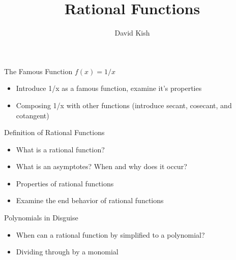 \documentclass{ximera}
\author{David Kish}
\title{Rational Functions}
\begin{document}
\begin{abstract}
\end{abstract}
\maketitle


\begin{objectives}

\item The Famous Function $f(x)=1/x$
\begin{itemize}
	\item Introduce 1/x as a famous function, examine it’s properties 
	\item Composing 1/x with other functions (introduce secant, cosecant, and cotangent) 
\end{itemize}


\item Definition of Rational Functions
\begin{itemize}
	\item What is a rational function?
	\item What is an asymptotes?  When and why does it occur?
	\item Properties of rational functions
	\item Examine the end behavior of rational functions
\end{itemize}

\item Polynomials in Disguise
\begin{itemize}
	\item When can a rational function by simplified to a polynomial?
	\item Dividing through by a monomial
\end{itemize}

\end{objectives}
\end{document}
